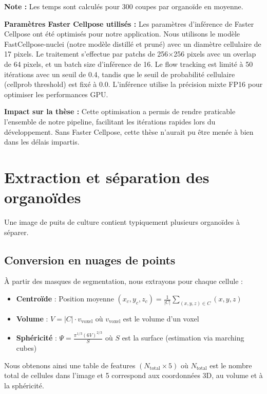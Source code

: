 \textbf{Note :} Les temps sont calculés pour 300 coupes par organoïde en moyenne.

\textbf{Paramètres Faster Cellpose utilisés :}
Les paramètres d'inférence de Faster Cellpose ont été optimisés pour notre application. Nous utilisons le modèle FastCellpose-nuclei (notre modèle distillé et pruné) avec un diamètre cellulaire de 17 pixels. Le traitement s'effectue par patchs de 256×256 pixels avec un overlap de 64 pixels, et un batch size d'inférence de 16. Le flow tracking est limité à 50 itérations avec un seuil de 0.4, tandis que le seuil de probabilité cellulaire (cellprob threshold) est fixé à 0.0. L'inférence utilise la précision mixte FP16 pour optimiser les performances GPU.

\textbf{Impact sur la thèse :}
Cette optimisation a permis de rendre praticable l'ensemble de notre pipeline, facilitant les itérations rapides lors du développement. Sans Faster Cellpose, cette thèse n'aurait pu être menée à bien dans les délais impartis.

\section{Extraction et séparation des organoïdes}

Une image de puits de culture contient typiquement plusieurs organoïdes à séparer.

\subsection{Conversion en nuages de points}

À partir des masques de segmentation, nous extrayons pour chaque cellule :
\begin{itemize}
    \item \textbf{Centroïde} : Position moyenne $(x_c, y_c, z_c) = \frac{1}{|C|}\sum_{(x,y,z) \in C} (x,y,z)$
    \item \textbf{Volume} : $V = |C| \cdot v_{\text{voxel}}$ où $v_{\text{voxel}}$ est le volume d'un voxel
    \item \textbf{Sphéricité} : $\Psi = \frac{\pi^{1/3}(6V)^{2/3}}{S}$ où $S$ est la surface (estimation via marching cubes)
\end{itemize}

Nous obtenons ainsi une table de features $(N_{\text{total}} \times 5)$ où $N_{\text{total}}$ est le nombre total de cellules dans l'image et 5 correspond aux coordonnées 3D, au volume et à la sphéricité.

